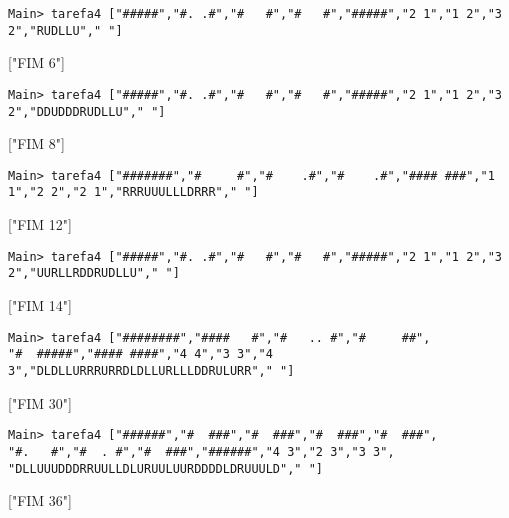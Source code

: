 \documentclass[a4paper,12pt]{report}
\begin{document}
\begin{tcolorbox}[width=\textwidth,colback={black},title={\sf Teste D.3:},outer arc=0mm,colupper=white]    
	{\footnotesize\tt *Main> tarefa4 ["\#\#\#\#\#","\#. .\#","\#   \#","\#   \#","\#\#\#\#\#","2 1","1 2","3 2","RUDLLU"," "]
		
		["FIM 6"] }
\end{tcolorbox} 

\begin{tcolorbox}[width=\textwidth,colback={black},title={\sf Teste D.4:},outer arc=0mm,colupper=white]    
	{\footnotesize\tt *Main> tarefa4 ["\#\#\#\#\#","\#. .\#","\#   \#","\#   \#","\#\#\#\#\#","2 1","1 2","3 2","DDUDDDRUDLLU"," "]
		
		["FIM 8"] }
\end{tcolorbox} 

\begin{tcolorbox}[width=\textwidth,colback={black},title={\sf Teste D.5:},outer arc=0mm,colupper=white]    
	{\footnotesize\tt *Main> tarefa4 ["\#\#\#\#\#\#\#","\#     \#","\#    .\#","\#    .\#","\#\#\#\# \#\#\#","1 1","2 2","2 1","RRRUUULLLDRRR"," "]
		
		["FIM 12"] }
\end{tcolorbox}



\begin{tcolorbox}[width=\textwidth,colback={black},title={\sf Teste D.6:},outer arc=0mm,colupper=white]    
	{\footnotesize\tt *Main> tarefa4 ["\#\#\#\#\#","\#. .\#","\#   \#","\#   \#","\#\#\#\#\#","2 1","1 2","3 2","UURLLRDDRUDLLU"," "]
		
		["FIM 14"] }
\end{tcolorbox}

\begin{tcolorbox}[width=\textwidth,colback={black},title={\sf Teste D.7:},outer arc=0mm,colupper=white]    
	{\footnotesize\tt *Main> tarefa4 ["\#\#\#\#\#\#\#\#","\#\#\#\#   \#","\#   .. \#","\#     \#\#", "\#  \#\#\#\#\#","\#\#\#\# \#\#\#\#","4 4","3 3","4 3","DLDLLURRRURRDLDLLURLLLDDRULURR"," "]
		
		["FIM 30"] }
\end{tcolorbox}

\begin{tcolorbox}[width=\textwidth,colback={black},title={\sf Teste D.8:},outer arc=0mm,colupper=white]    
	{\footnotesize\tt *Main> tarefa4 ["\#\#\#\#\#\#","\#  \#\#\#","\#  \#\#\#","\#  \#\#\#","\#  \#\#\#", "\#.   \#","\#  . \#","\#  \#\#\#","\#\#\#\#\#\#","4 3","2 3","3 3", "DLLUUUDDDRRUULLDLURUULUURDDDDLDRUUULD"," "]
		
		["FIM 36"] }
\end{tcolorbox}
\end{document}

